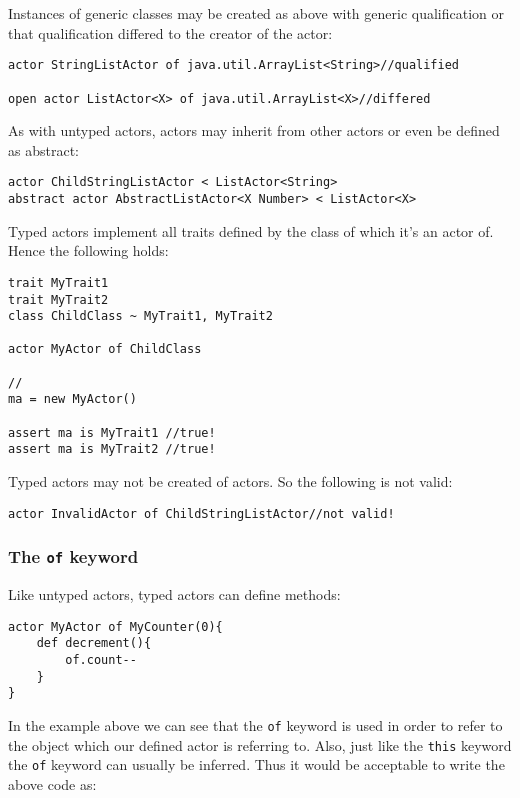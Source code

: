 \documentclass[conc-doc]{subfiles}
\begin{document}
Instances of generic classes may be created as above with generic qualification or that qualification differed to the creator of the actor:

\begin{lstlisting}
actor StringListActor of java.util.ArrayList<String>//qualified

open actor ListActor<X> of java.util.ArrayList<X>//differed
\end{lstlisting}

As with untyped actors, actors may inherit from other actors or even be defined as abstract:

\begin{lstlisting}
actor ChildStringListActor < ListActor<String>
abstract actor AbstractListActor<X Number> < ListActor<X>
\end{lstlisting}

Typed actors implement all traits defined by the class of which it's an actor of. Hence the following holds:

\begin{lstlisting}
trait MyTrait1
trait MyTrait2
class ChildClass ~ MyTrait1, MyTrait2

actor MyActor of ChildClass

//
ma = new MyActor()

assert ma is MyTrait1 //true!
assert ma is MyTrait2 //true!
\end{lstlisting}

Typed actors may not be created of actors. So the following is not valid:

\begin{lstlisting}
actor InvalidActor of ChildStringListActor//not valid!
\end{lstlisting}

\subsubsection{The \lstinline!of! keyword}
\label{subsubsec:ofKeyword}
Like untyped actors, typed actors can define methods:

\begin{lstlisting}
actor MyActor of MyCounter(0){
	def decrement(){
		of.count--
	}
}
\end{lstlisting}

In the example above we can see that the \lstinline{of} keyword is used in order to refer to the object which our defined actor is referring to. Also, just like the \lstinline{this} keyword the \lstinline{of} keyword can usually be inferred. Thus it would be acceptable to write the above code as:
\end{document}
